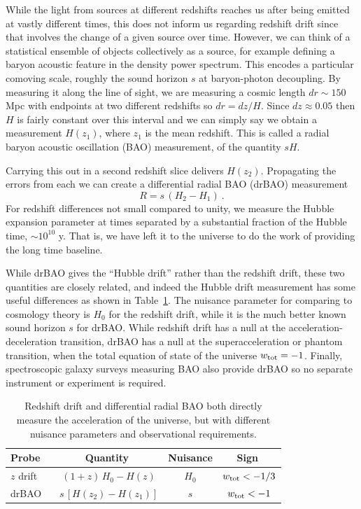 \documentclass[preprint]{aastex}
\newcommand{\be}{\begin{equation}}
\newcommand{\ee}{\end{equation}}
\begin{document}
While the light from sources at different redshifts reaches us after 
being emitted at vastly different times, this does not inform us regarding 
redshift drift since that involves the change of a given source over time.  
However, we can think of a statistical ensemble of objects collectively as 
a source, for example 
defining a baryon acoustic feature in the density power spectrum.  This 
encodes a particular comoving scale, roughly the sound horizon $s$ at 
baryon-photon decoupling.  By measuring it along the line of sight, we 
are measuring a cosmic length $dr\sim150$ Mpc with endpoints at two 
different redshifts so $dr=dz/H$.  Since $dz\approx0.05$ then $H$ is 
fairly constant over this interval and we can simply say we obtain a 
measurement $H(z_1)$, where $z_1$ is the mean redshift.  This is called a 
radial baryon acoustic oscillation (BAO) measurement, of the quantity 
$sH$. 

Carrying this out in a second redshift slice delivers $H(z_2)$.  Propagating 
the errors from each we can create a differential radial BAO (drBAO) 
measurement 
\be 
R=s\,(H_2-H_1) \ . \label{eq:drbao} 
\ee 
For redshift differences not small compared to unity, we measure the 
Hubble expansion parameter at times separated by a substantial fraction 
of the Hubble time, $\sim10^{10}$ y.  That is, we have left it to the universe 
to do the work of providing the long time baseline.  

While drBAO gives the 
``Hubble drift'' rather than the redshift drift, these two quantities are 
closely related, and indeed the Hubble drift measurement has some 
useful differences as shown in Table~\ref{tab:drbao}.  The nuisance 
parameter for comparing to cosmology theory is $H_0$ for the redshift 
drift, while it is the much better known sound horizon $s$ for drBAO.  
While redshift drift has a null at the acceleration-deceleration transition, 
drBAO has a null at the superacceleration or phantom transition, when the 
total equation of state of the universe $w_{\rm tot}=-1$.  Finally, 
spectroscopic galaxy surveys measuring BAO also provide drBAO so no 
separate instrument or experiment is required. 


\begin{table}[!htb]
\begin{tabular}{l|ccc} 
Probe \ & \ Quantity \ & Nuisance & \ Sign \ \\ 
\hline 
$z$ drift &$(1+z)\,H_0-H(z)$ & $H_0$ & $w_{\rm tot}<-1/3$ \\ 
drBAO & $s\,[H(z_2)-H(z_1)]$ & $s$ & $w_{\rm tot}<-1$ \\ 
\end{tabular} 
\caption{Redshift drift and differential radial BAO both 
directly measure the acceleration of the universe, but with different 
nuisance parameters and observational requirements. 
}
\label{tab:drbao}
\end{table} 
\end{document}
